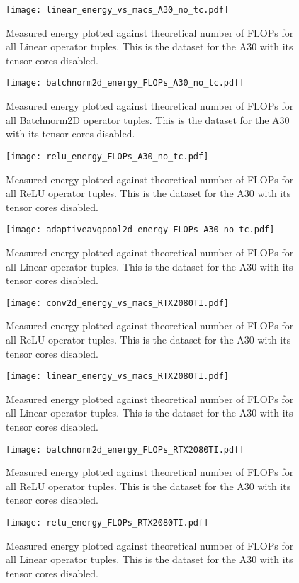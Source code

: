 \documentclass[conference]{IEEEtran}
\begin{document}
\begin{figure}
    \texttt{[image: linear\_energy\_vs\_macs\_A30\_no\_tc.pdf]}
    \caption{Measured energy plotted against theoretical number of FLOPs for all Linear operator tuples. This is the dataset for the A30 with its tensor cores disabled.}
    \label{fig:lina30notc}
    \texttt{[image: batchnorm2d\_energy\_FLOPs\_A30\_no\_tc.pdf]}
    \caption{Measured energy plotted against theoretical number of FLOPs for all Batchnorm2D operator tuples. This is the dataset for the A30 with its tensor cores disabled.}
    \label{fig:batchnorm2da30notc}
\end{figure}


\begin{figure}
    \texttt{[image: relu\_energy\_FLOPs\_A30\_no\_tc.pdf]}
    \caption{Measured energy plotted against theoretical number of FLOPs for all ReLU operator tuples. This is the dataset for the A30 with its tensor cores disabled.}
    \label{fig:relua30notc}
    \texttt{[image: adaptiveavgpool2d\_energy\_FLOPs\_A30\_no\_tc.pdf]}
    \caption{Measured energy plotted against theoretical number of FLOPs for all Linear operator tuples. This is the dataset for the A30 with its tensor cores disabled.}
    \label{fig:lina30notc}
\end{figure}

\begin{figure}
    \texttt{[image: conv2d\_energy\_vs\_macs\_RTX2080TI.pdf]}
    \caption{Measured energy plotted against theoretical number of FLOPs for all ReLU operator tuples. This is the dataset for the A30 with its tensor cores disabled.}
    \label{fig:relua30notc}
    \texttt{[image: linear\_energy\_vs\_macs\_RTX2080TI.pdf]}
    \caption{Measured energy plotted against theoretical number of FLOPs for all Linear operator tuples. This is the dataset for the A30 with its tensor cores disabled.}
    \label{fig:lina30notc}
\end{figure}

\begin{figure}
    \texttt{[image: batchnorm2d\_energy\_FLOPs\_RTX2080TI.pdf]}
    \caption{Measured energy plotted against theoretical number of FLOPs for all ReLU operator tuples. This is the dataset for the A30 with its tensor cores disabled.}
    \label{fig:relua30notc}
    \texttt{[image: relu\_energy\_FLOPs\_RTX2080TI.pdf]}
    \caption{Measured energy plotted against theoretical number of FLOPs for all Linear operator tuples. This is the dataset for the A30 with its tensor cores disabled.}
    \label{fig:lina30notc}
\end{figure}
\end{document}
